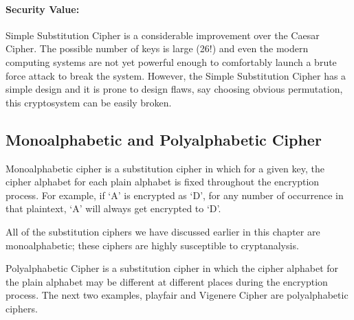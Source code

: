 \documentclass[british]{article}
\begin{document}
\paragraph*{Security Value:}

Simple Substitution Cipher is a considerable improvement over the
Caesar Cipher. The possible number of keys is large (26!) and even
the modern computing systems are not yet powerful enough to comfortably
launch a brute force attack to break the system. However, the Simple
Substitution Cipher has a simple design and it is prone to design
flaws, say choosing obvious permutation, this cryptosystem can be
easily broken.

\subsection{Monoalphabetic and Polyalphabetic Cipher}

Monoalphabetic cipher is a substitution cipher in which for a given
key, the cipher alphabet for each plain alphabet is fixed throughout
the encryption process. For example, if ‘A’ is encrypted as ‘D’, for
any number of occurrence in that plaintext, ‘A’ will always get encrypted
to ‘D’.

All of the substitution ciphers we have discussed earlier in this
chapter are monoalphabetic; these ciphers are highly susceptible to
cryptanalysis.

Polyalphabetic Cipher is a substitution cipher in which the cipher
alphabet for the plain alphabet may be different at different places
during the encryption process. The next two examples, playfair and
Vigenere Cipher are polyalphabetic ciphers.
\end{document}
